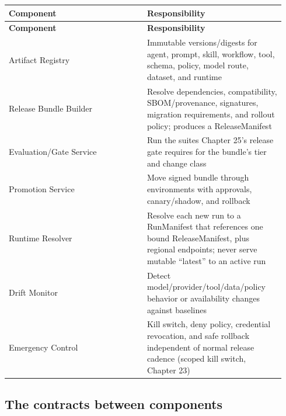 \BookTableStart
\small
\begin{longtable}{@{}Y{0.4700\linewidth}Y{0.4700\linewidth}@{}}
\color{white}\bfseries \textbf{Component} & \color{white}\bfseries \textbf{Responsibility} \\
\endfirsthead
{}
\color{white}\bfseries \textbf{Component} & \color{white}\bfseries \textbf{Responsibility} \\
\endhead
Artifact Registry & Immutable versions/digests for agent, prompt, skill, workflow, tool, schema, policy, model route, dataset, and runtime \\
Release Bundle Builder & Resolve dependencies, compatibility, SBOM/provenance, signatures, migration requirements, and rollout policy; produces a ReleaseManifest \\
Evaluation/Gate Service & Run the suites Chapter 25's release gate requires for the bundle's tier and change class \\
Promotion Service & Move signed bundle through environments with approvals, canary/shadow, and rollback \\
Runtime Resolver & Resolve each new run to a RunManifest that references one bound ReleaseManifest, plus regional endpoints; never serve mutable “latest” to an active run \\
Drift Monitor & Detect model/provider/tool/data/policy behavior or availability changes against baselines \\
Emergency Control & Kill switch, deny policy, credential revocation, and safe rollback independent of normal release cadence (scoped kill switch, Chapter 23) \\
\end{longtable}
\BookTableEnd

\subsection{The contracts between components}


